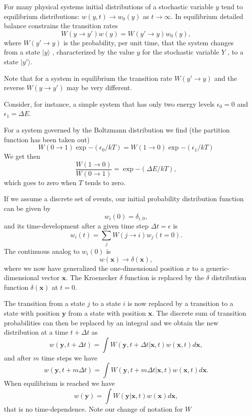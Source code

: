      For many physical systems initial distributions of a stochastic 
variable $y$ tend to equilibrium distributions: $w(y, t)\rightarrow w_0(y)$ 
as $t\rightarrow\infty$. In
equilibrium detailed balance constrains the transition rates
\[
     W(y\rightarrow y')w(y ) = W(y'\rightarrow y)w_0 (y),
\]
where $W(y'\rightarrow y)$ 
is the probability, per unit time, that the system changes
from a state $|y\rangle$ , characterized by the value $y$ 
for the stochastic variable $Y$ , to a state $|y'\rangle$.

Note that for a system in equilibrium the transition rate 
$W(y'\rightarrow y)$ and
the reverse $W(y\rightarrow y')$ may be very different. 

Consider, for instance, a simple
system that has only two energy levels $\epsilon_0 = 0$ and 
$\epsilon_1 = \Delta E$. 

For a system governed by the Boltzmann distribution we find (the partition function has been taken out)
\[
     W(0\rightarrow 1)\exp{-(\epsilon_0/kT)} = W(1\rightarrow 0)\exp{-(\epsilon_1/kT)}
\]
We get then
\[
     \frac{W(1\rightarrow 0)}{W(0 \rightarrow 1)}=\exp{-(\Delta E/kT)},
\]
which goes to zero when $T$ tends to zero.

If we assume a discrete set of events,
our initial probability
distribution function can be  given by 
\[
   w_i(0) = \delta_{i,0},
\]
and its time-development after a given time step $\Delta t=\epsilon$ is
\[ 
   w_i(t) = \sum_{j}W(j\rightarrow i)w_j(t=0).
\] 
The continuous analog to $w_i(0)$ is
\[
   w(\mathbf{x})\rightarrow \delta(\mathbf{x}),
\]
where we now have generalized the one-dimensional position $x$ to a generic-dimensional  
vector $\mathbf{x}$. The Kroenecker $\delta$ function is replaced by the $\delta$ distribution
function $\delta(\mathbf{x})$ at  $t=0$.  

The transition from a state $j$ to a state $i$ is now replaced by a transition
to a state with position $\mathbf{y}$ from a state with position $\mathbf{x}$. 
The discrete sum of transition probabilities can then be replaced by an integral
and we obtain the new distribution at a time $t+\Delta t$ as 
\[
   w(\mathbf{y},t+\Delta t)= \int W(\mathbf{y},t+\Delta t| \mathbf{x},t)w(\mathbf{x},t)d\mathbf{x},
\]
and after $m$ time steps we have
\[
   w(\mathbf{y},t+m\Delta t)= \int W(\mathbf{y},t+m\Delta t| \mathbf{x},t)w(\mathbf{x},t)d\mathbf{x}.
\]
When equilibrium is reached we have
\[
   w(\mathbf{y})= \int W(\mathbf{y}|\mathbf{x}, t)w(\mathbf{x})d\mathbf{x},
\]
that is no time-dependence. Note our change of notation for $W$

